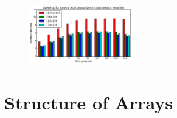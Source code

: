 \documentclass[12pt, a4paper]{article}
\begin{document}
  \begin{multicols}{2}

    \begin{figure}[H]
      \caption{} \vspace{-0.8cm}
      \label{wgs}
      \begin{center}
        \includegraphics[width=0.4\textwidth]{figures/workgroupsize}
      \end{center}
    \end{figure}

    \section*{Structure of Arrays}

  \end{multicols}
\end{document}
